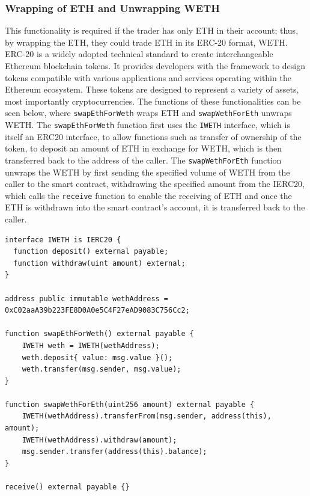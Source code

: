 \subsubsection{Wrapping of ETH and Unwrapping WETH}
This functionality is required if the trader has only ETH in their account; thus, by wrapping the ETH, they could trade ETH in its ERC-20 format, WETH. ERC-20 is a widely adopted technical standard to create interchangeable Ethereum blockchain tokens. It provides developers with the framework to design tokens compatible with various applications and services operating within the Ethereum ecosystem. These tokens are designed to represent a variety of assets, most importantly cryptocurrencies. The functions of these functionalities can be seen below, where \texttt{swapEthForWeth} wraps ETH and \texttt{swapWethForEth} unwraps WETH. The \texttt{swapEthForWeth} function first uses the \texttt{IWETH} interface, which is itself an ERC20 interface, to allow functions such as transfer of ownership of the token, to deposit an amount of ETH in exchange for WETH, which is then transferred back to the address of the caller. The \texttt{swapWethForEth} function unwraps the WETH by first sending the specified volume of WETH from the caller to the smart contract, withdrawing the specified amount from the IERC20, which calls the \texttt{receive} function to enable the receiving of ETH and once the ETH is withdrawn into the smart contract's account, it is transferred back to the caller.
\begin{lstlisting}[language=Solidity]
interface IWETH is IERC20 {
  function deposit() external payable;
  function withdraw(uint amount) external;
}

address public immutable wethAddress = 0xC02aaA39b223FE8D0A0e5C4F27eAD9083C756Cc2;

function swapEthForWeth() external payable {
    IWETH weth = IWETH(wethAddress);
    weth.deposit{ value: msg.value }();
    weth.transfer(msg.sender, msg.value);
}

function swapWethForEth(uint256 amount) external payable {
    IWETH(wethAddress).transferFrom(msg.sender, address(this), amount);
    IWETH(wethAddress).withdraw(amount);
    msg.sender.transfer(address(this).balance);
}

receive() external payable {}
\end{lstlisting}

